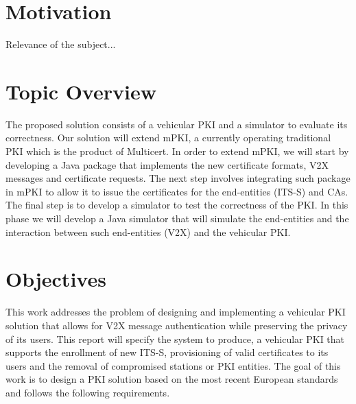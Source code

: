 \section{Motivation}
\label{section:motivation}

Relevance of the subject...


\section{Topic Overview}
\label{contributions}
The proposed solution consists of a vehicular PKI and a simulator to evaluate its correctness. Our solution will extend mPKI, a currently operating traditional PKI which is the product of Multicert. In order to extend mPKI, we will start by developing a Java package that implements the new certificate formats, V2X messages and certificate requests. The next step involves integrating such package in mPKI to allow it to issue the certificates for the end-entities (ITS-S) and CAs. The final step is to develop a simulator to test the correctness of the PKI. In this phase we will develop a Java simulator that will simulate the end-entities and the interaction between such end-entities (V2X) and the vehicular PKI. 



\section{Objectives}
\label{goals}

This work addresses the problem of designing and implementing a vehicular PKI solution that allows for V2X message authentication while preserving the privacy of its users. This report will specify the system to produce, a vehicular PKI that supports the enrollment of new ITS-S, provisioning of valid certificates to its users and the removal of compromised stations or PKI entities. The goal of this work is to design a PKI solution based on the most recent European standards and follows the following requirements.

